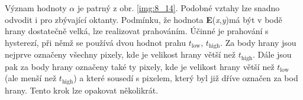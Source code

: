 Význam hodnoty $\alpha$ je patrný z obr. \ref{img:8_14}. Podobné vztahy lze snadno odvodit i pro zbývající oktanty. Podmínku, že hodnota \textbar \textbf{E}(\textit{x},\textit{y})\textbar  má být v bodě hrany dostatečně velká, lze realizovat prahováním. Účinné je prahování s hysterezí, při němž se používá dvou hodnot prahu $t_{\mathrm{low}}$, $t_{\mathrm{high}}$. Za body hrany jsou nejprve označeny všechny pixely, kde je velikost hrany větší než $t_{\mathrm{high}}$. Dále jsou pak za body hrany označeny také ty pixely, kde je velikost hrany větší než $t_{\mathrm{low}}$ (ale menší než $t_{\mathrm{high}}$) a které sousedí s pixelem, který byl již dříve označen za bod hrany. Tento krok lze opakovat několikrát.







